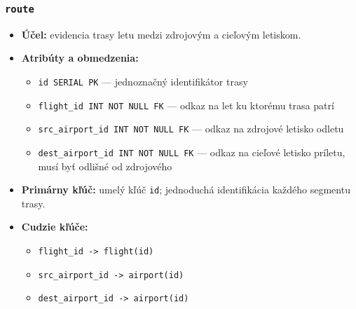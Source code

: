 \documentclass[11pt, a4paper]{article}
\begin{document}
\subsubsection*{\texttt{route}}
\begin{itemize}
    \item \textbf{Účel:} evidencia trasy letu medzi zdrojovým a cieľovým letiskom.
    \item \textbf{Atribúty a obmedzenia:}
    \begin{itemize}
        \item \texttt{id SERIAL PK} --- jednoznačný identifikátor trasy
        \item \texttt{flight\_id INT NOT NULL FK} --- odkaz na let ku ktorému trasa patrí
        \item \texttt{src\_airport\_id INT NOT NULL FK} --- odkaz na zdrojové letisko odletu
        \item \texttt{dest\_airport\_id INT NOT NULL FK} --- odkaz na cieľové letisko príletu, musí byť odlišné od zdrojového
    \end{itemize}
    \item \textbf{Primárny kľúč:} umelý kľúč \texttt{id}; jednoduchá identifikácia každého segmentu trasy.
    \item \textbf{Cudzie kľúče:} 
        \begin{itemize}
            \item \texttt{flight\_id -> flight(id)}
            \item \texttt{src\_airport\_id -> airport(id)}
            \item \texttt{dest\_airport\_id -> airport(id)}
        \end{itemize}
\end{itemize}
\end{document}
